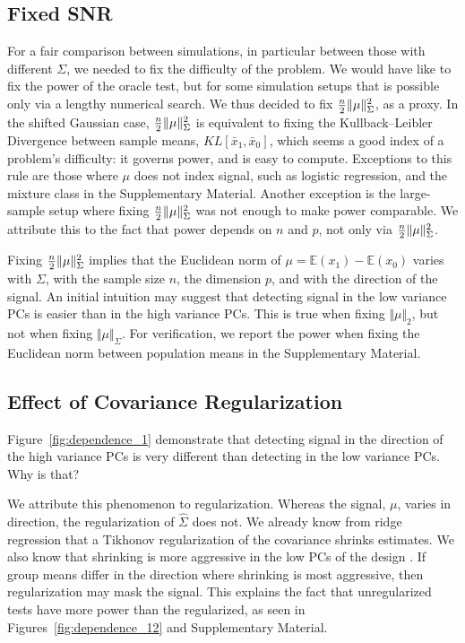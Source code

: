 \documentclass[oupdraft]{bio}
\begin{document}
\subsection{Fixed SNR}
\label{sec:fix_snr}

For a fair comparison between simulations, in particular between those with different $\Sigma$, we needed to fix the difficulty of the problem.
We would have like to fix the power of the oracle test, but for some simulation setups that is possible only via a lengthy numerical search. 
We thus decided to fix $\frac{n}{2}\Vert \mu \Vert^2_\Sigma$, as a proxy.
In the shifted Gaussian case, $\frac{n}{2}\Vert \mu \Vert^2_\Sigma$ is equivalent to fixing the Kullback–Leibler Divergence between sample means, $KL[\bar x_1,\bar x_0]$, which seems a good index of a problem's difficulty: it governs power, and is easy to compute. 
Exceptions to this rule are those where $\mu$ does not index signal, such as logistic regression, and the mixture class in the Supplementary Material. 
Another exception is the large-sample setup where fixing $\frac{n}{2}\Vert \mu \Vert^2_\Sigma$ was not enough to make power comparable. 
We attribute this to the fact that power depends on $n$ and $p$, not only via $\frac{n}{2}\Vert \mu \Vert^2_\Sigma$.

Fixing $\frac{n}{2}\Vert \mu \Vert^2_\Sigma$ implies that the Euclidean norm of $\mu=\mathbb{E}(x_1)-\mathbb{E}(x_0)$ varies with $\Sigma$, with the sample size $n$, the dimension $p$, and with the direction of the signal.
An initial intuition may suggest that detecting signal in the low variance PCs is easier than in the high variance PCs. 
This is true when fixing $\Vert \mu \Vert_2$, but not when fixing $\Vert \mu \Vert_{\Sigma}$.
For verification, we report the power when fixing the Euclidean norm between population means in the Supplementary Material.



\subsection{Effect of Covariance Regularization}
\label{sec:regularizaton}

Figure~\ref{fig:dependence_1} demonstrate that detecting signal in the direction of the high variance PCs is very different than detecting in the low variance PCs.
Why is that?

We attribute this phenomenon to regularization.
Whereas the signal, $\mu$, varies in direction, the regularization of $\hat \Sigma$ does not. 
We already know from ridge regression that a Tikhonov regularization of the covariance shrinks estimates. 
We also know that shrinking is more aggressive in the low PCs of the design \citep{hastie_elements_2003}. 
If group means differ in the direction where shrinking is most aggressive, then regularization may mask the signal. 
This explains the fact that unregularized tests have more power than the regularized, as seen in Figures~\ref{fig:dependence_12} and Supplementary Material.
\end{document}
